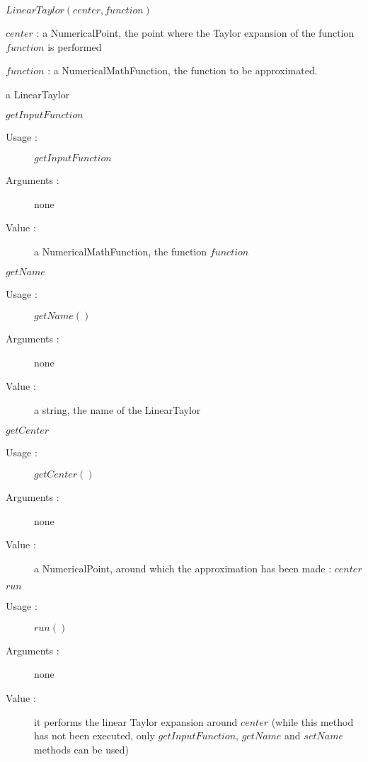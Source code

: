 \begin{description}

\item[Usage :] $LinearTaylor(center, function)$
  \bigskip

\item[Arguments :]  \rule{0pt}{1em}
  \begin{description}
  \item $center$ : a NumericalPoint, the point where the Taylor expansion of the function $function$ is performed
  \item $function$ : a NumericalMathFunction, the function to be approximated.
  \end{description}

\item[Value :] a LinearTaylor

\item[Some methods :]  \rule{0pt}{1em}
  \begin{description}

  \item $getInputFunction$
    \begin{description}
    \item[Usage :] $getInputFunction$
    \item[Arguments :] none
    \item[Value :] a NumericalMathFunction, the function $function$
    \end{description}
    \bigskip

  \item $getName$
    \begin{description}
    \item[Usage :] $getName()$
    \item[Arguments :] none
    \item[Value :] a string, the name of the LinearTaylor
    \end{description}
    \bigskip

  \item $getCenter$
    \begin{description}
    \item[Usage :] $getCenter()$
    \item[Arguments :] none
    \item[Value :] a NumericalPoint, around which the approximation has been made : $center$
    \end{description}
    \bigskip

  \item $run$
    \begin{description}
    \item[Usage :] $run()$
    \item[Arguments :] none
    \item[Value :] it performs the linear Taylor expansion around $center$
      (while this method has not been executed, only
      $getInputFunction$, $getName$ and $setName$ methods can be used)
    \end{description}
    \bigskip


\end{description}
\end{description}
